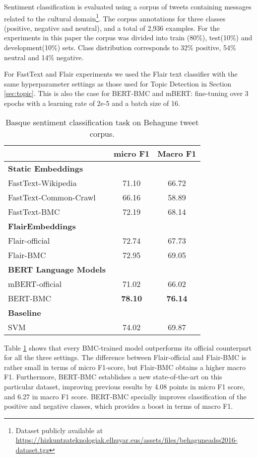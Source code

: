 \documentclass[10pt, a4paper]{article}
\begin{document}
Sentiment classification is evaluated using a corpus of tweets containing messages related to the cultural domain\footnote{Dataset publicly available at \scriptsize{\url{https://hizkuntzateknologiak.elhuyar.eus/assets/files/behaguneadss2016-dataset.tgz}}}. The corpus annotations for three classes (positive, negative and neutral), and a total of 2,936 examples. For the experiments in this paper the corpus was divided into train (80\%), test(10\%) and development(10\%) sets. Class distribution corresponds to 32\% positive, 54\% neutral and 14\% negative.

For FastText and Flair experiments we used the Flair text classifier with the same hyperparameter settings as those used for Topic Detection in Section \ref{sec:topic}. This is also the case for BERT-BMC and mBERT: fine-tuning over 3 epochs with a learning rate of 2e-5 and a batch size of 16.

\begin{table}[!ht]\small
\centering
\begin{tabular}{@{\hspace{0.3cm}}lcc} \hline
 {\textbf{}} & {\textbf{micro F1}} &  {\textbf{Macro F1}} \\ \hline
\textbf{Static Embeddings} & & \\
FastText-Wikipedia & 71.10 &	66.72 \\
FastText-Common-Crawl & 66.16 & 58.89  \\
FastText-BMC  & 72.19 &	68.14 \\
\hline%
\textbf{FlairEmbeddings}\\
Flair-official & 72.74 & 67.73 \\
Flair-BMC  & 72.95	& 69.05 \\ \hline
\textbf{BERT Language Models}\\
mBERT-official  & 71.02 & 66.02 \\
BERT-BMC  & \textbf{78.10}	& \textbf{76.14} \\
\hline
\textbf{Baseline} \\
SVM \cite{san2019multilingual} & 74.02 & 69.87\\ \hline
\end{tabular}
\caption{Basque sentiment classification task on Behagune tweet corpus.}\label{tab:sentiment}
\end{table}

Table \ref{tab:sentiment} shows that every BMC-trained model outperforms its official counterpart for all the three settings. The difference between Flair-official and Flair-BMC is rather small in terms of micro F1-score, but Flair-BMC obtains a higher macro F1. Furthermore, BERT-BMC establishes a new state-of-the-art on this particular dataset, improving previous results \cite{san2019multilingual} by 4.08 points in micro F1 score, and 6.27 in macro F1 score. BERT-BMC specially improves classification of the positive and negative classes, which provides a boost in terms of macro F1.
\end{document}
